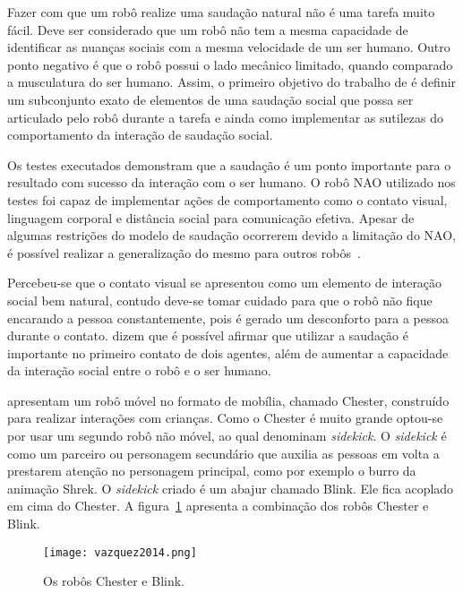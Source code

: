 Fazer com que um robô realize uma saudação natural não é uma tarefa muito fácil. Deve ser considerado que um robô não tem a mesma capacidade de identificar as nuanças sociais com a mesma velocidade de um ser humano. Outro ponto negativo é que o robô possui o lado mecânico limitado, quando comparado a musculatura do ser humano. Assim, o primeiro objetivo do trabalho de  é definir um subconjunto exato de elementos de uma saudação social que possa ser articulado pelo robô durante a tarefa e ainda como implementar as sutilezas do comportamento da interação de saudação social.

Os testes executados demonstram que a saudação é um ponto importante para o resultado com sucesso da interação com o ser humano. O robô NAO utilizado nos testes foi capaz de implementar ações de comportamento como o contato visual, linguagem corporal e distância social para comunicação efetiva. Apesar de algumas restrições do modelo de saudação ocorrerem devido a limitação do NAO, é possível realizar a generalização do mesmo para outros robôs~\cite{heenan:2014}.

Percebeu-se que o contato visual se apresentou como um elemento de interação social bem natural, contudo deve-se tomar cuidado para que o robô não fique encarando a pessoa constantemente, pois é gerado um desconforto para a pessoa durante o contato.  dizem que é possível afirmar que utilizar a saudação é importante no primeiro contato de dois agentes, além de aumentar a capacidade da interação social entre o robô e o ser humano.

 apresentam um robô móvel no formato de mobília, chamado Chester, construído para realizar interações com crianças. Como o Chester é muito grande optou-se por usar um segundo robô não móvel, ao qual  denominam \emph{sidekick}. O \emph{sidekick} é como um parceiro ou personagem secundário que auxilia as pessoas em volta a prestarem atenção no personagem principal, como por exemplo o burro da animação Shrek. O \emph{sidekick} criado é um abajur chamado Blink. Ele fica acoplado em cima do Chester. A figura~\ref{fig:vazquez} apresenta a combinação dos robôs Chester e Blink.

\begin{figure}[ht!]
	\centering
	\begin{minipage}{0.4\textwidth}
		\caption{Os robôs Chester e Blink.}
		\texttt{[image: vazquez2014.png]}
		\label{fig:vazquez}
	\end{minipage}
\end{figure}

